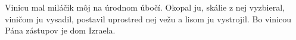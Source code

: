 Vinicu mal miláčik môj
na úrodnom úbočí.
\versseparator
Okopal ju, skálie z nej vyzbieral,
viničom ju vysadil,
postavil uprostred nej vežu
\versseparator
a lisom ju vystrojil.
Bo vinicou Pána zástupov je dom Izraela.